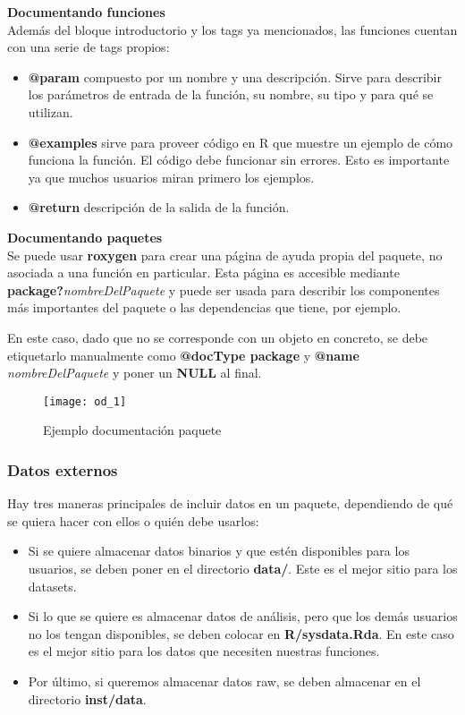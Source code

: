 \textbf{Documentando funciones} \\
Adem\'as del bloque introductorio y los tags ya mencionados, las funciones cuentan con una
serie de tags propios:
\begin{itemize}
    \item \textbf{@param} compuesto por un nombre y una descripci\'on. Sirve para describir los
par\'ametros de entrada de la funci\'on, su nombre, su tipo y para qu\'e se utilizan.
    \item \textbf{@examples} sirve para proveer c\'odigo en R que muestre un ejemplo de c\'omo funciona
la funci\'on. El c\'odigo debe funcionar sin errores. Esto es importante ya que muchos
usuarios miran primero los ejemplos.
    \item \textbf{@return} descripci\'on de la salida de la funci\'on.
\end{itemize}

\textbf{Documentando paquetes}\\
Se puede usar \textbf{roxygen} para crear una p\'agina de ayuda propia del paquete, no asociada a
una funci\'on en particular. Esta p\'agina es accesible mediante\\ \textbf{package?}\textit{nombreDelPaquete} y
puede ser usada para describir los componentes m\'as importantes del paquete o las
dependencias que tiene, por ejemplo.

En este caso, dado que no se corresponde con un objeto en concreto, se debe etiquetarlo
manualmente como \textbf{@docType package} y \textbf{@name} \textit{nombreDelPaquete} y poner un \textbf{NULL} al final.

\begin{figure}[H]
    \centering
    \texttt{[image: od\_1]}
    \caption{Ejemplo documentaci\'on paquete }
    \label{fig:paquete}
\end{figure} 

\subsubsection{Datos externos}

Hay tres maneras principales de incluir datos en un paquete, dependiendo de qu\'e se quiera
hacer con ellos o qui\'en debe usarlos:

\begin{itemize}
    \item Si se quiere almacenar datos binarios y que est\'en disponibles para los usuarios, se
deben poner en el directorio \textbf{data/}. Este es el mejor sitio para los datasets.
    \item Si lo que se quiere es almacenar datos de an\'alisis, pero que los dem\'as usuarios no
los tengan disponibles, se deben colocar en \textbf{R/sysdata.Rda}. En este caso es el mejor
sitio para los datos que necesiten nuestras funciones.
    \item Por \'ultimo, si queremos almacenar datos raw, se deben almacenar en el directorio
\textbf{inst/data}.
\end{itemize}

